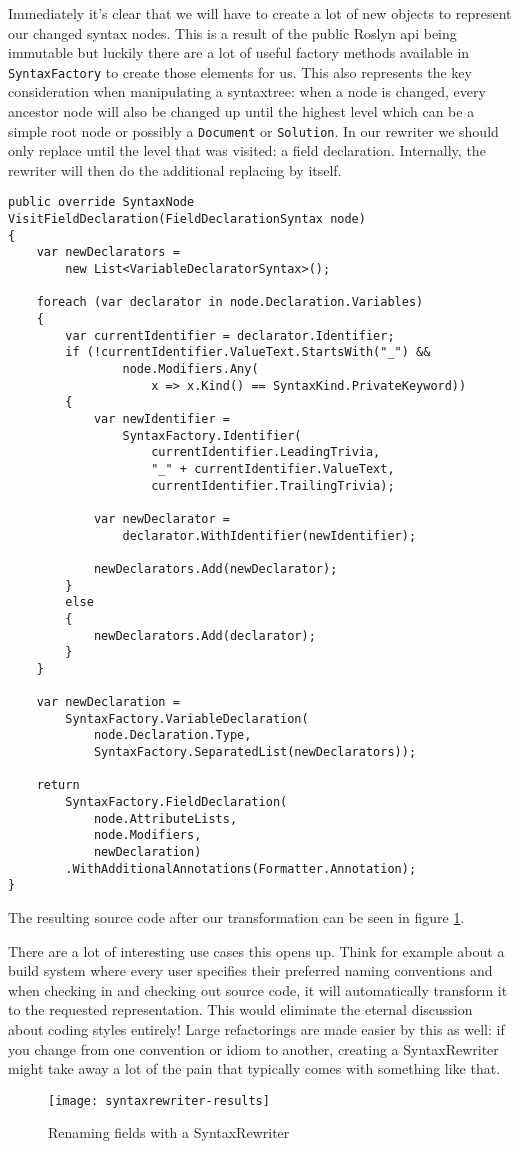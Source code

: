 Immediately it's clear that we will have to create a lot of new objects to represent our changed syntax nodes. This is a result of the public Roslyn \gls{api} being \gls{immutable} but luckily there are a lot of useful factory methods available in \texttt{SyntaxFactory} to create those elements for us. This also represents the key consideration when manipulating a \gls{syntaxtree}: when a node is changed, every ancestor node will also be changed up until the highest level which can be a simple root node or possibly a \texttt{Document} or \texttt{Solution}. In our rewriter we should only replace until the level that was visited: a field declaration. Internally, the rewriter will then do the additional replacing by itself.

\begin{lstlisting}[label={lst:syntaxrewriter-implementing-syntaxrewriter}]
public override SyntaxNode VisitFieldDeclaration(FieldDeclarationSyntax node)
{
	var newDeclarators = 
		new List<VariableDeclaratorSyntax>();

	foreach (var declarator in node.Declaration.Variables)
	{
		var currentIdentifier = declarator.Identifier;
		if (!currentIdentifier.ValueText.StartsWith("_") && 
				node.Modifiers.Any(
					x => x.Kind() == SyntaxKind.PrivateKeyword))
		{
			var newIdentifier = 
				SyntaxFactory.Identifier(
					currentIdentifier.LeadingTrivia, 
					"_" + currentIdentifier.ValueText, 
					currentIdentifier.TrailingTrivia);
					
			var newDeclarator = 
				declarator.WithIdentifier(newIdentifier);
				
			newDeclarators.Add(newDeclarator);
		}
		else
		{
			newDeclarators.Add(declarator);
		}
	}
	
	var newDeclaration = 
		SyntaxFactory.VariableDeclaration(
			node.Declaration.Type, 
			SyntaxFactory.SeparatedList(newDeclarators));
			
	return 
		SyntaxFactory.FieldDeclaration(
			node.AttributeLists, 
			node.Modifiers, 
			newDeclaration)
		.WithAdditionalAnnotations(Formatter.Annotation);
}
\end{lstlisting}


\noindent The resulting source code after our transformation can be seen in figure \ref{syntaxrewriter-results}.

There are a lot of interesting use cases this opens up. Think for example about a build system where every user specifies their preferred naming conventions and when checking in and checking out source code, it will automatically transform it to the requested representation. This would eliminate the eternal discussion about coding styles entirely! Large refactorings are made easier by this as well: if you change from one convention or idiom to another, creating a SyntaxRewriter might take away a lot of the pain that typically comes with something like that.

\begin{figure}[H]
\centering
\texttt{[image: syntaxrewriter-results]}
\caption[Renaming fields with a SyntaxRewriter]{Renaming fields with a SyntaxRewriter}
\label{syntaxrewriter-results}
\end{figure}
